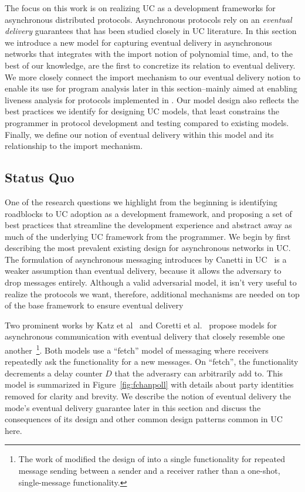 The focus on this work is on realizing UC as a development frameworks for asynchronous distributed protocols.
Asynchronous protocols rely on an \emph{eventual delivery} guarantees that has been studied closely in UC literature.
In this section we introduce a new model for capturing eventual delivery in asynchronous networks that integrates with the import notion of polynomial time, and, to the best of our knowledge, are the first to concretize its relation to eventual delivery.
We more closely connect the import mechanism to our eventual delivery notion to enable its use for program analysis later in this section--mainly aimed at enabling liveness analysis for protocols implemented in \us.
Our model design also reflects the best practices we identify for designing UC models, that least constrains the programmer in protocol development and testing compared to existing models.
Finally, we define our notion of eventual delivery within this model and its relationship to the import mechanism.



\subsection{Status Quo}
One of the research questions we highlight from the beginning is identifying roadblocks to UC adoption as a development framework, and proposing a set of best practices that streamline the development experience and abstract away as much of the underlying UC framework from the programmer.
We begin by first describing the most prevalent existing design for asynchronous networks in UC.
The formulation of asynchronous messaging introduces by Canetti in UC~\cite{uc} is a weaker assumption than eventual delivery, because it allows the adversary to drop messages entirely.
Although a valid adversarial model, it isn't very useful to realize the protocols we want, therefore, additional mechanisms are needed on top of the base framework to ensure eventual delivery

Two prominent works by Katz et al~\cite{katzuc} and Coretti et al.~\cite{corettimpc} propose models for asynchronous communication with eventual delivery that closely resemble one another~\footnote{The work of \cite{corettimpc} modified the design of \cite{katzuc} into a single functionality for repeated message sending between a sender and a receiver rather than a one-shot, single-message functionality.}.
Both models use a ``fetch'' model of messaging where receivers repeatedly ask the functionality for a new messages. 
On ``fetch'', the functionality decrements a delay counter $D$ that the adverasry can arbitrarily add to.
This model is summarized in Figure~\ref{fig:fchanpoll} with details about party identities removed for clarity and brevity.
We describe the notion of eventual delivery the mode's eventual delivery guarantee later in this section and discuss the consequences of its design and other common design patterns common in UC here. 

